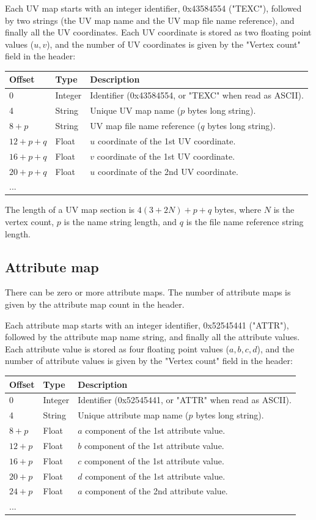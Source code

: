 Each UV map starts with an integer identifier, 0x43584554 ("TEXC"), followed
by two strings (the UV map name and the UV map file name reference), and
finally all the UV coordinates. Each UV coordinate is stored as two floating point
values ($u,v$), and the number of UV coordinates is given by the "Vertex count"
field in the header:

\begin{tabular}{|l|l|l|}\hline
\textbf{Offset} &  \textbf{Type} & \textbf{Description}\\ \hline
0 & Integer & Identifier (0x43584554, or "TEXC" when read as ASCII).\\ \hline
4 & String & Unique UV map name ($p$ bytes long string).\\ \hline
$8+p$ & String & UV map file name reference ($q$ bytes long string).\\ \hline
$12+p+q$ & Float & $u$ coordinate of the 1st UV coordinate.\\ \hline
$16+p+q$ & Float & $v$ coordinate of the 1st UV coordinate.\\ \hline
$20+p+q$ & Float & $u$ coordinate of the 2nd UV coordinate.\\ \hline
... & & \\ \hline
\end{tabular}

The length of a UV map section is $4(3+2N)+p+q$ bytes, where $N$ is the vertex
count, $p$ is the name string length, and $q$ is the file name reference string
length.

\subsection{Attribute map}
There can be zero or more attribute maps. The number of attribute maps is given by the
attribute map count in the header.

Each attribute map starts with an integer identifier, 0x52545441 ("ATTR"), followed
by the attribute map name string, and finally all the attribute values. Each attribute
value is stored as four floating point values ($a,b,c,d$), and the number of
attribute values is given by the "Vertex count" field in the header:

\begin{tabular}{|l|l|l|}\hline
\textbf{Offset} &  \textbf{Type} & \textbf{Description}\\ \hline
0 & Integer & Identifier (0x52545441, or "ATTR" when read as ASCII).\\ \hline
4 & String & Unique attribute map name ($p$ bytes long string).\\ \hline
$8+p$ & Float & $a$ component of the 1st attribute value.\\ \hline
$12+p$ & Float & $b$ component of the 1st attribute value.\\ \hline
$16+p$ & Float & $c$ component of the 1st attribute value.\\ \hline
$20+p$ & Float & $d$ component of the 1st attribute value.\\ \hline
$24+p$ & Float & $a$ component of the 2nd attribute value.\\ \hline
... & & \\ \hline
\end{tabular}

